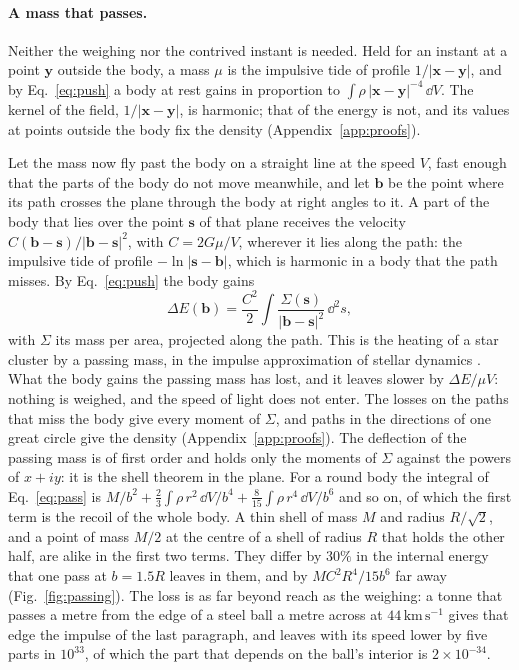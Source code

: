 \paragraph{A mass that passes.} Neither the weighing nor the contrived instant
is needed. Held for an instant at a point $\mathbf y$ outside the body, a
mass $\mu$ is the impulsive tide of profile
$1/|\mathbf x - \mathbf y|$, and by Eq.~\eqref{eq:push} a body at rest gains
in proportion to $\int\rho\,|\mathbf x - \mathbf y|^{-4}\,\dd V$. The kernel
of the field, $1/|\mathbf x - \mathbf y|$, is harmonic; that of the energy is
not, and its values at points outside the body fix the density
(Appendix~\ref{app:proofs}).

Let the mass now fly past the body on a straight line at the speed $V$, fast
enough that the parts of the body do not move meanwhile, and let $\mathbf b$
be the point where its path crosses the plane through the body at right angles
to it. A part of the body that lies over the point $\mathbf s$ of that plane
receives the velocity $C(\mathbf b - \mathbf s)/|\mathbf b - \mathbf s|^2$,
with $C = 2G\mu/V$, wherever it lies along the path: the impulsive tide of
profile $-\ln|\mathbf s - \mathbf b|$, which is harmonic in a body that the
path misses. By Eq.~\eqref{eq:push} the body gains
\begin{equation}\label{eq:pass}
\Delta E(\mathbf b) = \frac{C^2}{2}\int
\frac{\Sigma(\mathbf s)}{|\mathbf b - \mathbf s|^2}\,\dd^2s ,
\end{equation}
with $\Sigma$ its mass per area, projected along the path. This is the heating
of a star cluster by a passing mass, in the impulse approximation of stellar
dynamics \cite{Spitzer1958,BanikVanDenBosch2021}. What the body gains the passing mass has lost,
and it leaves slower by $\Delta E/\mu V$: nothing is weighed, and the speed of
light does not enter. The losses on the paths that miss the body give every
moment of $\Sigma$, and paths in the directions of one great circle give the
density (Appendix~\ref{app:proofs}). The deflection of the passing mass is of
first order and holds only the moments of $\Sigma$ against the powers of
$x + iy$: it is the shell theorem in the plane. For a round body the integral
of Eq.~\eqref{eq:pass} is
$M/b^2 + \tfrac23\int\rho\,r^2\,\dd V/b^4 + \tfrac{8}{15}\int\rho\,r^4\,\dd V/b^6$
and so on, of which the first term is the recoil of the whole body. A thin shell
of mass $M$ and radius $R/\sqrt2$, and a point of mass $M/2$ at the centre of
a shell of radius $R$ that holds the other half, are alike in the first two
terms. They differ by
$30\%$ in the internal energy that one pass at $b = 1.5R$ leaves in them, and
by $MC^2R^4/15b^6$ far away (Fig.~\ref{fig:passing}). The loss is as far beyond reach as the weighing:
a tonne that passes a metre from the edge of a steel ball a metre across at
$44\,\mathrm{km\,s^{-1}}$ gives that edge the impulse of the last paragraph,
and leaves with its speed lower by five parts in $10^{33}$, of which the part
that depends on the ball's interior is $2\times10^{-34}$.

